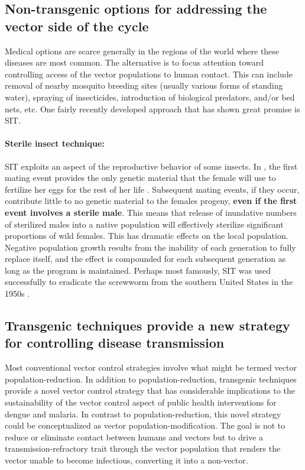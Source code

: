 \subsection[Addressing the vector side of the cycle (conventionally)]{Non-transgenic options for addressing the vector side of the cycle}

Medical options are scarce generally in the regions of the world where these diseases are most common.
The alternative is to focus attention toward controlling access of the vector populations to human contact.
This can include removal of nearby mosquito breeding sites (usually various forms of standing water), spraying of insecticides, introduction of biological predators, and/or bed nets, etc.
One fairly recently developed approach that has shown great promise is \gls{SIT}.



\paragraph*{Sterile insect technique:}
\gls{SIT} exploits an aspect of the reproductive behavior of some insects. 
In \Aa, the first mating event provides the only genetic material that the female will use to fertilize her eggs for the rest of her life \cite{Craig1967}.
Subsequent mating events, if they occur, contribute little to no genetic material to the females progeny, \textbf{even if the first event involves a sterile male}.
This means that release of inundative numbers of sterilized males into a native population will effectively sterilize significant proportions of wild females.
This has dramatic effects on the local population.
Negative population growth results from the inability of each generation to fully replace itself, and the effect is compounded for each subsequent generation as long as the program is maintained.
Perhaps most famously, \gls{SIT} was used successfully to eradicate the screwworm from the southern United States in the 1950s \cite{Bushland1955}.


\subsection[Transgenesis provides new vector control strategy]{Transgenic techniques provide a new strategy for controlling disease transmission}

Most conventional vector control strategies involve what might be termed vector \gls{population-reduction}.
In addition to \gls{population-reduction}, transgenic techniques provide a novel vector control strategy that has considerable implications to the sustainability of the vector control aspect of public health interventions for dengue and malaria.
In contrast to \gls{population-reduction}, this novel strategy could be conceptualized as vector \gls{population-modification}.
The goal is not to reduce or eliminate contact between humans and vectors but to drive a transmission-refractory trait through the vector population that renders the vector unable to become infectious, converting it into a non-vector.

